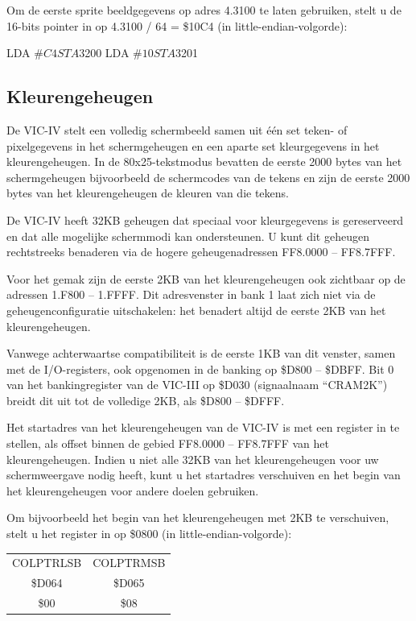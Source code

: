 Om de eerste sprite beeldgegevens op adres 4.3100 te laten gebruiken, stelt u de 16-bits pointer in op 4.3100 / 64 = \$10C4 (in little-endian-volgorde):

\begin{asmcode}
LDA #$C4
STA $3200
LDA #$10
STA $3201
\end{asmcode}

\subsection{Kleurengeheugen}

De VIC-IV stelt een volledig schermbeeld samen uit één set teken- of pixelgegevens in het schermgeheugen en een aparte set kleurgegevens in het kleurengeheugen. In de 80x25-tekstmodus bevatten de eerste 2000 bytes van het schermgeheugen bijvoorbeeld de schermcodes van de tekens en zijn de eerste 2000 bytes van het kleurengeheugen de kleuren van die tekens.

De VIC-IV heeft 32KB geheugen dat speciaal voor kleurgegevens is gereserveerd en dat alle mogelijke schermmodi kan ondersteunen. U kunt dit geheugen rechtstreeks benaderen via de hogere geheugenadressen FF8.0000 -- FF8.7FFF.

Voor het gemak zijn de eerste 2KB van het kleurengeheugen ook zichtbaar op de adressen 1.F800 -- 1.FFFF. Dit adresvenster in bank 1 laat zich niet via de geheugenconfiguratie uitschakelen: het benadert altijd de eerste 2KB van het kleurengeheugen.

Vanwege achterwaartse compatibiliteit is de eerste 1KB van dit venster, samen met de I/O-registers, ook opgenomen in de banking op \$D800 -- \$DBFF. Bit 0 van het bankingregister van de VIC-III op \$D030 (signaalnaam ``CRAM2K'') breidt dit uit tot de volledige 2KB, als \$D800 -- \$DFFF.

Het startadres van het kleurengeheugen van de VIC-IV is met een register in te stellen, als offset binnen de gebied FF8.0000 -- FF8.7FFF van het kleurengeheugen. Indien u niet alle 32KB van het kleurengeheugen voor uw schermweergave nodig heeft, kunt u het startadres verschuiven en het begin van het kleurengeheugen voor andere doelen gebruiken.

Om bijvoorbeeld het begin van het kleurengeheugen met 2KB te verschuiven, stelt u het register in op \$0800 (in little-endian-volgorde):

\begin{center}
\begin{tabular}{|c|c|}
\hline
COLPTRLSB & COLPTRMSB \\\$D064 & \$D065 \\
\hline
\$00 & \$08 \\
\hline
\end{tabular}
\end{center}

